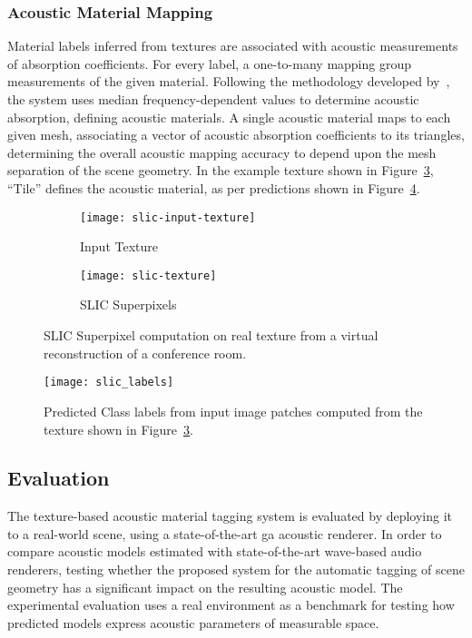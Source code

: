 \subsubsection{Acoustic Material Mapping}
Material labels inferred from textures are associated with acoustic measurements of absorption coefficients. For every label, a one-to-many mapping group measurements of the given material. Following the methodology developed by~\cite{kim2020acoustic}, the system uses median frequency-dependent values to determine acoustic absorption, defining acoustic materials. A single acoustic material maps to each given mesh, associating a vector of acoustic absorption coefficients to its triangles, determining the overall acoustic mapping accuracy to depend upon the mesh separation of the scene geometry. In the example texture shown in Figure~\ref{fig:slic-generation}, ``Tile'' defines the acoustic material, as per predictions shown in Figure~\ref{fig:slic-label-inference}.
\begin{figure}[htbp]
    \centering
    \begin{subfigure}[t]{0.49\textwidth}
       \centering
       \texttt{[image: slic-input-texture]}
       \caption{Input Texture}
       \label{fig:slic-input-texture}
    \end{subfigure}
    \begin{subfigure}[t]{0.49\textwidth}
       \centering
       \texttt{[image: slic-texture]}
       \caption{SLIC Superpixels}
       \label{fig:slic-labels}
    \end{subfigure}
\caption[SLIC superpixel computation on an input texture]{SLIC Superpixel computation on real texture from a virtual reconstruction of a conference room.}
\label{fig:slic-generation}
\end{figure}%
\begin{figure}[htbp]
    \centering
    \texttt{[image: slic\_labels]}
    \caption[Superpixel algorithm used to generate image patches]{Predicted Class labels from input image patches computed from the texture shown in Figure~\ref{fig:slic-generation}.}
    \label{fig:slic-label-inference}
\end{figure}

\subsection{Evaluation}
The texture-based acoustic material tagging system is evaluated by deploying it to a real-world scene, using a state-of-the-art \acrshort{ga} acoustic renderer. In order to compare acoustic models estimated with state-of-the-art wave-based audio renderers, testing whether the proposed system for the automatic tagging of scene geometry has a significant impact on the resulting acoustic model. The experimental evaluation uses a real environment as a benchmark for testing how predicted models express acoustic parameters of measurable space.

